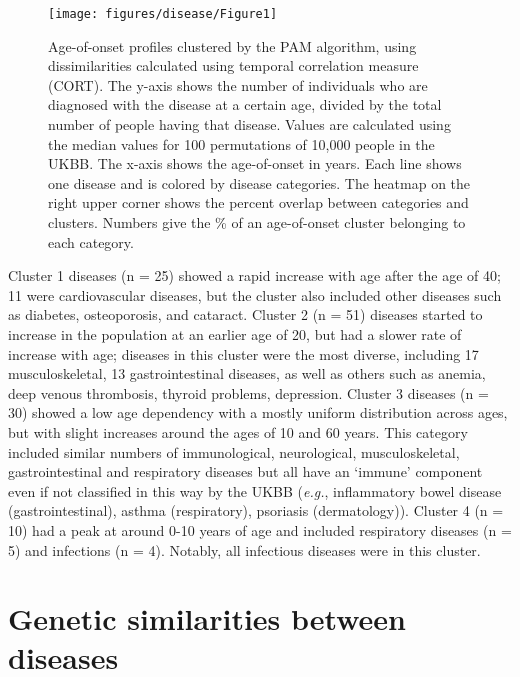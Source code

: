 \documentclass[12pt,twoside]{unicam}
\begin{document}
\begin{figure}

{\centering \texttt{[image: figures/disease/Figure1]} 

}

\caption[Age-of-onset clusters.]{Age-of-onset profiles clustered by the PAM algorithm, using dissimilarities calculated using temporal correlation measure (CORT). The y-axis shows the number of individuals who are diagnosed with the disease at a certain age, divided by the total number of people having that disease. Values are calculated using the median values for 100 permutations of 10,000 people in the UKBB. The x-axis shows the age-of-onset in years. Each line shows one disease and is colored by disease categories. The heatmap on the right upper corner shows the percent overlap between categories and clusters. Numbers give the \% of an age-of-onset cluster belonging to each category.}\label{fig:disFig1}
\end{figure}

Cluster 1 diseases (n = 25) showed a rapid increase with age after the age of 40; 11 were cardiovascular diseases, but the cluster also included other diseases such as diabetes, osteoporosis, and cataract. Cluster 2 (n = 51) diseases started to increase in the population at an earlier age of 20, but had a slower rate of increase with age; diseases in this cluster were the most diverse, including 17 musculoskeletal, 13 gastrointestinal diseases, as well as others such as anemia, deep venous thrombosis, thyroid problems, depression. Cluster 3 diseases (n = 30) showed a low age dependency with a mostly uniform distribution across ages, but with slight increases around the ages of 10 and 60 years. This category included similar numbers of immunological, neurological, musculoskeletal, gastrointestinal and respiratory diseases but all have an `immune' component even if not classified in this way by the UKBB (\emph{e.g.}, inflammatory bowel disease (gastrointestinal), asthma (respiratory), psoriasis (dermatology)). Cluster 4 (n = 10) had a peak at around 0-10 years of age and included respiratory diseases (n = 5) and infections (n = 4). Notably, all infectious diseases were in this cluster.

\hypertarget{genetic-similarities-between-diseases}{%
\section{Genetic similarities between diseases}\label{genetic-similarities-between-diseases}}
\end{document}
